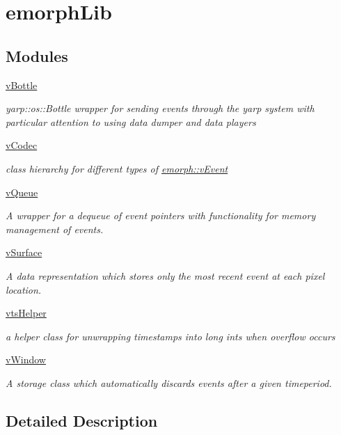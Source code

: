 \hypertarget{group__emorphLib}{\section{emorph\-Lib}
\label{group__emorphLib}
}
\subsection*{Modules}
\begin{DoxyCompactItemize}
\item 
\hyperlink{group__vBottle}{v\-Bottle}
\begin{DoxyCompactList}\small\item\em yarp\-::os\-::\-Bottle wrapper for sending events through the yarp system with particular attention to using data dumper and data players \end{DoxyCompactList}\item 
\hyperlink{group__vCodec}{v\-Codec}
\begin{DoxyCompactList}\small\item\em class hierarchy for different types of \hyperlink{classemorph_1_1vEvent}{emorph\-::v\-Event} \end{DoxyCompactList}\item 
\hyperlink{group__vQueue}{v\-Queue}
\begin{DoxyCompactList}\small\item\em A wrapper for a dequeue of event pointers with functionality for memory management of events. \end{DoxyCompactList}\item 
\hyperlink{group__vSurface}{v\-Surface}
\begin{DoxyCompactList}\small\item\em A data representation which stores only the most recent event at each pixel location. \end{DoxyCompactList}\item 
\hyperlink{group__vtsHelper}{vts\-Helper}
\begin{DoxyCompactList}\small\item\em a helper class for unwrapping timestamps into long ints when overflow occurs \end{DoxyCompactList}\item 
\hyperlink{group__vWindow}{v\-Window}
\begin{DoxyCompactList}\small\item\em A storage class which automatically discards events after a given timeperiod. \end{DoxyCompactList}\end{DoxyCompactItemize}


\subsection{Detailed Description}
